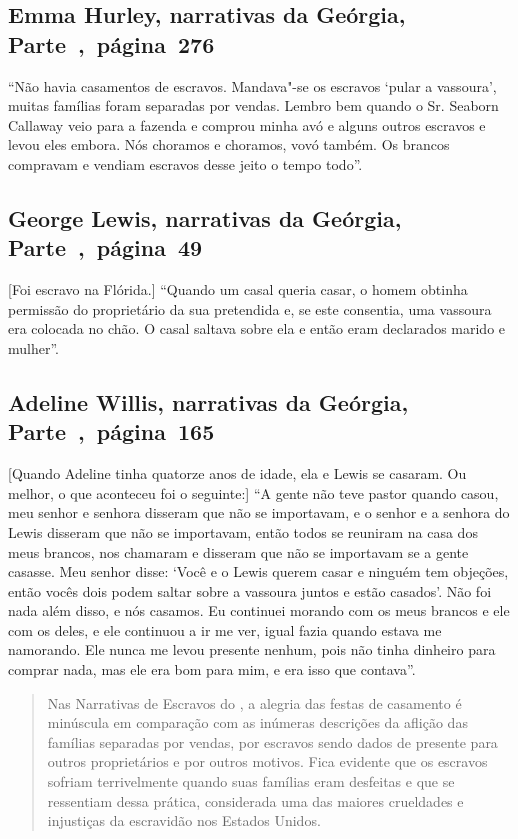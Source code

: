 \subsection{Emma Hurley, narrativas da Geórgia, Parte~,~página~276}
\label{ref158}

``Não havia casamentos de escravos. Mandava"-se os escravos `pular a
vassoura', muitas famílias foram separadas por vendas. Lembro bem
quando o Sr. Seaborn Callaway veio para a fazenda e comprou minha avó e
alguns outros escravos e levou eles embora. Nós choramos e choramos,
vovó também. Os brancos compravam e vendiam escravos desse jeito o tempo
todo''.

\subsection{George Lewis, narrativas da Geórgia, Parte~,~página~49}
\label{ref172}

{[}Foi escravo na Flórida.{]} ``Quando um casal queria casar, o homem obtinha permissão do
proprietário da sua pretendida e, se este consentia, uma vassoura era
colocada no chão. O casal saltava sobre ela e então eram declarados
marido e mulher''.

\subsection{Adeline Willis, narrativas da Geórgia, Parte~,~página~165}
\label{ref298}

{[}Quando Adeline tinha quatorze anos de idade, ela e Lewis se casaram. Ou melhor, o que aconteceu foi o seguinte:{]} ``A gente não teve pastor quando
casou, meu senhor e senhora disseram que não se importavam, e o senhor e
a senhora do Lewis disseram que não se importavam, então todos se
reuniram na casa dos meus brancos, nos chamaram e disseram que não se
importavam se a gente casasse. Meu senhor disse: `Você e o Lewis querem
casar e ninguém tem objeções, então vocês dois podem saltar sobre a
vassoura juntos e estão casados'. Não foi nada além disso, e nós
casamos. Eu continuei morando com os meus brancos e ele com os deles, e
ele continuou a ir me ver, igual fazia quando estava me namorando. Ele
nunca me levou presente nenhum, pois não tinha dinheiro para comprar
nada, mas ele era bom para mim, e era isso que contava''.

\begin{quote}
Nas Narrativas de Escravos do , a alegria das festas de
casamento é minúscula em comparação com as inúmeras descrições da
aflição das famílias separadas por vendas, por escravos sendo dados de
presente para outros proprietários e por outros motivos. Fica evidente
que os escravos sofriam terrivelmente quando suas famílias eram
desfeitas e que se ressentiam dessa prática, considerada uma das maiores
crueldades e injustiças da escravidão nos Estados Unidos.
\end{quote}

